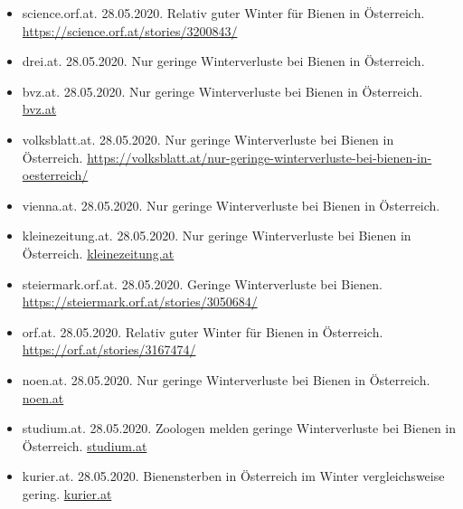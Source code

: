 \begin{itemize}
    \item
    science.orf.at. 28.05.2020. Relativ guter Winter für Bienen in Österreich. \url{https://science.orf.at/stories/3200843/}
    
    \item
    drei.at. 28.05.2020. Nur geringe Winterverluste bei Bienen in Österreich.  
    
    \item
    bvz.at. 28.05.2020. Nur geringe Winterverluste bei Bienen in Österreich. \href{https://www.bvz.at/in-ausland/uni-graz-erforschte-nur-geringe-winterverluste-bei-bienen-in-oesterreich-oesterreich-agrar-tierkrankheiten-zoologie-oesterreich-207676823}{bvz.at}
    
    \item
    volksblatt.at. 28.05.2020. Nur geringe Winterverluste bei Bienen in Österreich. \url{https://volksblatt.at/nur-geringe-winterverluste-bei-bienen-in-oesterreich/}
    
    \item
    vienna.at. 28.05.2020. Nur geringe Winterverluste bei Bienen in Österreich. 
    
    \item
    kleinezeitung.at. 28.05.2020. Nur geringe Winterverluste bei Bienen in Österreich. \href{https://www.kleinezeitung.at/international/tiere/5819585/Imker-zufrieden_Geringe-Winterverluste-bei-unseren-Bienen}{kleinezeitung.at}
    
    \item
    steiermark.orf.at. 28.05.2020. Geringe Winterverluste bei Bienen. \url{https://steiermark.orf.at/stories/3050684/ }
    
    \item
    orf.at. 28.05.2020. Relativ guter Winter für Bienen in Österreich. 
    \url{https://orf.at/stories/3167474/}
    
    \item
    noen.at. 28.05.2020. Nur geringe Winterverluste bei Bienen in Österreich. \href{https://www.noen.at/in-ausland/uni-graz-erforschte-nur-geringe-winterverluste-bei-bienen-in-oesterreich-oesterreich-agrar-tierkrankheiten-zoologie-oesterreich-207676823}{noen.at}
    
    \item
    studium.at. 28.05.2020. Zoologen melden geringe Winterverluste bei Bienen in Österreich. \href{https://www.studium.at/zoologen-melden-geringe-winterverluste-bei-bienen-oesterreich}{studium.at}
    
    \item
    kurier.at. 28.05.2020. Bienensterben in Österreich im Winter vergleichsweise gering. \href{https://kurier.at/chronik/oesterreich/bienensterben-in-oesterreich-im-winter-vergleichsweise-gering/400854374}{kurier.at}
    

\end{itemize}
